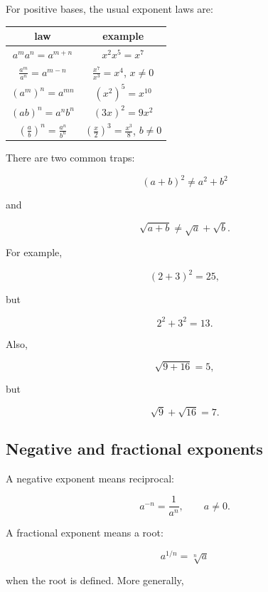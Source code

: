 For positive bases, the usual exponent laws are:

\begin{center}
\renewcommand{\arraystretch}{1.7}
\begin{tabular}{c|c}
\textbf{law} & \textbf{example} \\ \hline
\(\displaystyle a^m a^n=a^{m+n}\) &
\(\displaystyle x^2x^5=x^7\) \\

\(\displaystyle \frac{a^m}{a^n}=a^{m-n}\) &
\(\displaystyle \frac{x^7}{x^3}=x^4\), \(x\neq0\) \\

\(\displaystyle (a^m)^n=a^{mn}\) &
\(\displaystyle (x^2)^5=x^{10}\) \\

\(\displaystyle (ab)^n=a^n b^n\) &
\(\displaystyle (3x)^2=9x^2\) \\

\(\displaystyle \left(\frac ab\right)^n=\frac{a^n}{b^n}\) &
\(\displaystyle \left(\frac{x}{2}\right)^3=\frac{x^3}{8}\), \(b\neq0\)
\end{tabular}
\end{center}

There are two common traps:

\[
(a+b)^2\neq a^2+b^2
\]

and

\[
\sqrt{a+b}\neq \sqrt a+\sqrt b.
\]

For example,

\[
(2+3)^2=25,
\]

but

\[
2^2+3^2=13.
\]

Also,

\[
\sqrt{9+16}=5,
\]

but

\[
\sqrt9+\sqrt{16}=7.
\]

\subsection{Negative and fractional exponents}
\label{appsubsec:negative-fractional-exponents}

A negative exponent means reciprocal:

\[
\boxed{
a^{-n}=\frac1{a^n},
\qquad a\neq0.
}
\]

A fractional exponent means a root:

\[
\boxed{
a^{1/n}=\sqrt[n]{a}
}
\]

when the root is defined.  More generally,

